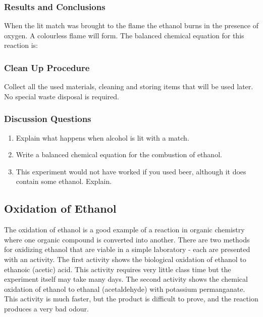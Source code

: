 \subsubsection*{Results and Conclusions}
When the lit match was brought to the flame the ethanol burns in the presence of oxygen. A colourless flame will form. The balanced chemical equation for this reaction is:
\begin{center}
\end{center}

\subsubsection*{Clean Up Procedure}
Collect all the used materials, cleaning and storing items that will be used later. No special waste disposal is required.

\subsubsection*{Discussion Questions}
\begin{enumerate}
\item{Explain what happens when alcohol is lit with a match.}
\item{Write a balanced chemical equation for the combustion of ethanol.}
\item{This experiment would not have worked if you used beer, although it does contain some ethanol. Explain.}
\end{enumerate}

\subsection{Oxidation of Ethanol}

The oxidation of ethanol is a good example of a reaction in organic chemistry where one organic compound is converted into another. There are two methods for oxidizing ethanol that are viable in a simple laboratory - each are presented with an activity. The first activity shows the biological oxidation of ethanol to ethanoic (acetic) acid. This activity requires very little class time but the experiment itself may take many days. The second activity shows the chemical oxidation of ethanol to ethanal (acetaldehyde) with potassium permanganate. This activity is much faster, but the product is difficult to prove, and the reaction produces a very bad odour.

